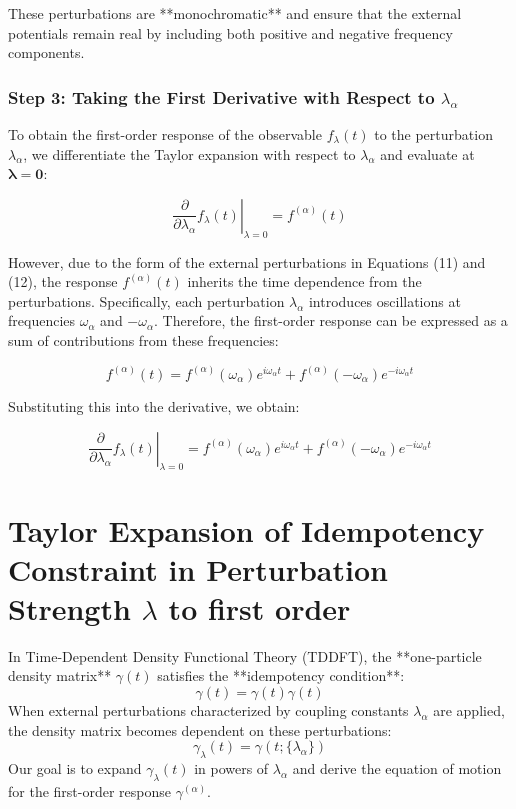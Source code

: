 \noindent These perturbations are **monochromatic** and ensure that the external potentials remain real by including both positive and negative frequency components.

\subsubsection*{Step 3: Taking the First Derivative with Respect to \( \lambda_{\alpha} \)}

To obtain the first-order response of the observable \( f_{\lambda}(t) \) to the perturbation \( \lambda_{\alpha} \), we differentiate the Taylor expansion with respect to \( \lambda_{\alpha} \) and evaluate at \( \boldsymbol{\lambda} = \mathbf{0} \):

\[
\left.\frac{\partial}{\partial \lambda_{\alpha}} f_{\lambda}(t)\right|_{\lambda=0} = f^{(\alpha)}(t)
\]

\noindent However, due to the form of the external perturbations in Equations (11) and (12), the response \( f^{(\alpha)}(t) \) inherits the time dependence from the perturbations. Specifically, each perturbation \( \lambda_{\alpha} \) introduces oscillations at frequencies \( \omega_{\alpha} \) and \( -\omega_{\alpha} \). Therefore, the first-order response can be expressed as a sum of contributions from these frequencies:

\[
f^{(\alpha)}(t) = f^{(\alpha)}(\omega_{\alpha}) e^{i \omega_{\alpha} t} + f^{(\alpha)}(-\omega_{\alpha}) e^{-i \omega_{\alpha} t}
\]

\noindent Substituting this into the derivative, we obtain:

\[
\left.\frac{\partial}{\partial \lambda_{\alpha}} f_{\lambda}(t)\right|_{\lambda=0} = f^{(\alpha)}(\omega_{\alpha}) e^{i \omega_{\alpha} t} + f^{(\alpha)}(-\omega_{\alpha}) e^{-i \omega_{\alpha} t} 
\]


\section{Taylor Expansion of Idempotency Constraint in Perturbation Strength $\lambda$ to first order}
\label{sec:firstOrderIdempotency}

In Time-Dependent Density Functional Theory (TDDFT), the **one-particle density matrix** \( \gamma(t) \) satisfies the **idempotency condition**:
\begin{equation}
\gamma(t) = \gamma(t) \gamma(t) \end{equation}
When external perturbations characterized by coupling constants \( \lambda_{\alpha} \) are applied, the density matrix becomes dependent on these perturbations:
\begin{equation}
\gamma_{\lambda}(t) = \gamma(t; \{\lambda_{\alpha}\}) \end{equation}
Our goal is to expand \( \gamma_{\lambda}(t) \) in powers of \( \lambda_{\alpha} \) and derive the equation of motion for the first-order response \( \gamma^{(\alpha)} \).

